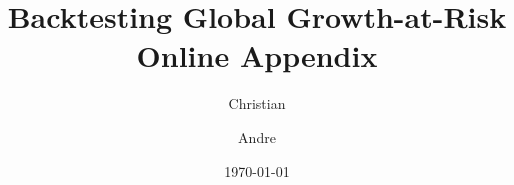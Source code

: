 \documentclass[a4paper,12pt]{article}
\title{{\sc Backtesting Global Growth-at-Risk \\ Online Appendix}}
\author{Christian \and Andre }
\date{ \today }
\begin{document}
\maketitle
\clearpage 

\begin{table}[!htbp]
  \centering
\scalebox{0.6}{

}
\end{table}

\begin{sidewaystable}[!htbp]
  \centering
\scalebox{0.6}{

}
\end{sidewaystable}


\begin{table}[!htbp]
  \centering
\scalebox{0.6}{

}
\end{table}


\begin{table}[!htbp]
  \centering
\scalebox{0.6}{

}
\end{table}

\begin{table}[!htbp]
\centering
\scalebox{0.6}{

}
\end{table}

\begin{table}[!htbp]
\centering
\scalebox{0.6}{


}
\end{table}
\end{document}
